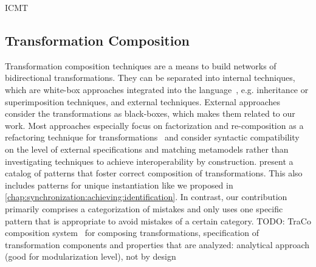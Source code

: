 \begin{copiedFrom}{ICMT}
\subsection*{Transformation Composition}
Transformation composition techniques are a means to build networks of bidirectional transformations.
They can be separated into internal techniques, which are white-box approaches integrated into the language~\cite{wagelaar2008a, wagelaar2010a, wagelaar2011a}, e.g. inheritance or superimposition techniques, and external techniques.
External approaches consider the transformations as black-boxes, which makes them related to our work.
Most approaches especially focus on factorization and re-composition as a refactoring technique for transformations~\cite{cuadrado2008a} and consider syntactic compatibility on the level of external specifications and matching metamodels rather than investigating techniques to achieve interoperability by construction.
\textcite{lano2014a} present a catalog of patterns that foster correct composition of transformations.
This also includes patterns for unique instantiation like we proposed in \autoref{chap:synchronization:achieving:identification}.
In contrast, our contribution primarily comprises a categorization of mistakes %
and only uses one specific pattern that is appropriate to avoid mistakes of a certain category. %
TODO: TraCo composition system~\cite{heidenreich2010composition} for composing transformations, specification of transformation components and properties that are analyzed: analytical approach (good for modularization level), not by design




\end{copiedFrom}
